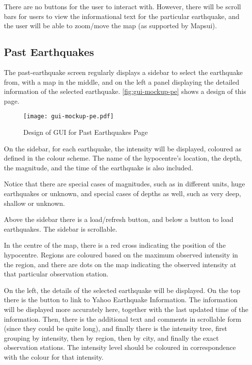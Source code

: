 There are no buttons for the user to interact with. However, there will be scroll bars for users to view the informational text for the particular earthquake, and the user will be able to zoom/move the map (as supported by Mapsui).

\subsection{Past Earthquakes}

The past-earthquake screen regularly displays a sidebar to select the earthquake from, with a map in the middle, and on the left a panel displaying the detailed information of the selected earthquake. \autoref{fig:gui-mockup-pe} shows a design of this page.

\begin{figure}[htp]
    \centering
    \texttt{[image: gui-mockup-pe.pdf]}
    \caption{Design of GUI for Past Earthquakes Page}
    \label{fig:gui-mockup-pe}
\end{figure}

On the sidebar, for each earthquake, the intensity will be displayed, coloured as defined in the colour scheme. The name of the hypocentre's location, the depth, the magnitude, and the time of the earthquake is also included.

Notice that there are special cases of magnitudes, such as in different units, huge earthquakes or unknown, and special cases of depths as well, such as very deep, shallow or unknown.

Above the sidebar there is a load/refresh button, and below a button to load earthquakes. The sidebar is scrollable.

In the centre of the map, there is a red cross indicating the position of the hypocentre. Regions are coloured based on the maximum observed intensity in the region, and there are dots on the map indicating the observed intensity at that particular observation station.

On the left, the details of the selected earthquake will be displayed. On the top there is the button to link to Yahoo Earthquake Information. The information will be displayed more accurately here, together with the last updated time of the information. Then, there is the additional text and comments in scrollable form (since they could be quite long), and finally there is the intensity tree, first grouping by intensity, then by region, then by city, and finally the exact observation stations. The intensity level should be coloured in correspondence with the colour for that intensity.

